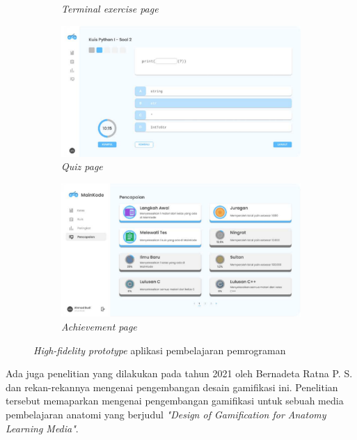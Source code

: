 \begin{figure}[H]
\begin{subfigure}[b]{0.4\textwidth}
		\caption{\textit{Terminal exercise page}}
		\label{fig:sub3-a3}
	\end{subfigure}  
	\begin{subfigure}[b]{0.4\textwidth}
		\centering
		\includegraphics[width=\linewidth]{contents/chapter-2/images/Evan-a4.png}
		\caption{\textit{Quiz page}}
		\label{fig:sub4-a4}
	\end{subfigure} 
	\begin{subfigure}[b]{0.4\textwidth}
		\centering
		\includegraphics[width=\linewidth]{contents/chapter-2/images/Evan-a5.png}
		\caption{\textit{Achievement page}}
		\label{fig:sub5-a5}
	\end{subfigure} 
	\caption{\textit{High-fidelity prototype} aplikasi pembelajaran pemrograman \cite{GamificationInProgLang}}
	\label{fig:High-fidelity prototype Evan}
  \end{figure}
Ada juga penelitian yang dilakukan pada tahun 2021 oleh Bernadeta Ratna P. S. dan rekan-rekannya mengenai pengembangan desain gamifikasi ini.
Penelitian tersebut memaparkan mengenai pengembangan gamifikasi untuk sebuah media pembelajaran anatomi yang berjudul \textit{"Design of Gamification for Anatomy Learning Media"}\cite{AnatomyGamification}.
